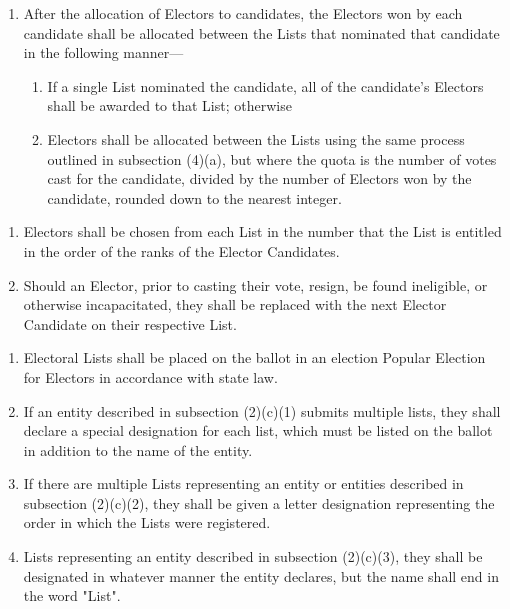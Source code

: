 \documentclass{article}
\begin{document}
    \begin{enumerate}
        \item After the allocation of Electors to candidates, the Electors won by each candidate shall be allocated between the Lists that nominated that candidate in the following manner---
        \begin{enumerate}
            \item If a single List nominated the candidate, all of the candidate's Electors shall be awarded to that List; otherwise
            \item Electors shall be allocated between the Lists using the same process outlined in subsection (4)(a), but where the quota is the number of votes cast for the candidate, divided by the number of Electors won by the candidate, rounded down to the nearest integer.
        \end{enumerate}
    \end{enumerate}
    \begin{enumerate}
        \item Electors shall be chosen from each List in the number that the List is entitled in the order of the ranks of the Elector Candidates.
        \item Should an Elector, prior to casting their vote, resign, be found ineligible, or otherwise incapacitated, they shall be replaced with the next Elector Candidate on their respective List.
    \end{enumerate}
    \begin{enumerate}
        \item Electoral Lists shall be placed on the ballot in an election Popular Election for Electors in accordance with state law.
        \item If an entity described in subsection (2)(c)(1) submits multiple lists, they shall declare a special designation for each list, which must be listed on the ballot in addition to the name of the entity.
        \item If there are multiple Lists representing an entity or entities described in subsection (2)(c)(2), they shall be given a letter designation representing the order in which the Lists were registered.
        \item Lists representing an entity described in subsection (2)(c)(3), they shall be designated in whatever manner the entity declares, but the name shall end in the word "List". 
    \end{enumerate}
\end{document}
